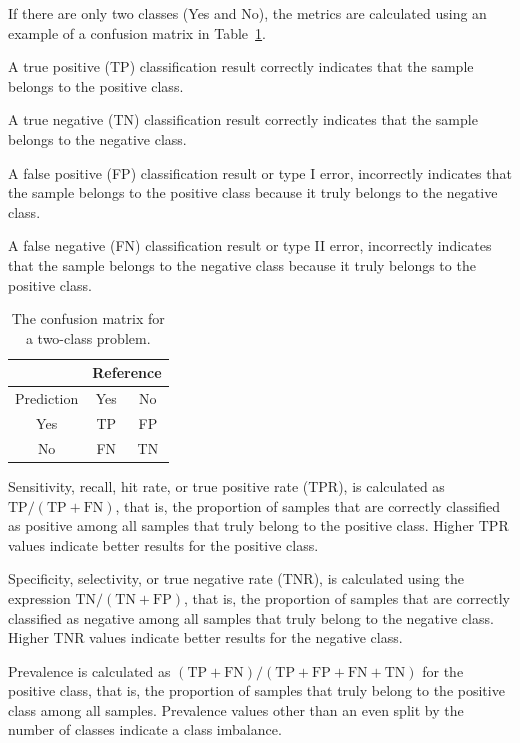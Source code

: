 \documentclass[sn-mathphys-num]{sn-jnl}%
\begin{document}
If there are only two classes (Yes and No), the metrics are calculated using an example of a confusion matrix in Table~\ref{tab:cm}.

A true positive (TP) classification result correctly indicates that the sample belongs to the positive class.

A true negative (TN) classification result correctly indicates that the sample belongs to the negative class.
 
A false positive (FP) classification result or type I error, incorrectly indicates that the sample belongs to the positive class because it truly belongs to the negative class.

A false negative (FN) classification result or type II error, incorrectly indicates that the sample belongs to the negative class because it truly belongs to the positive class.

\begin{table}[!ht]
    \centering
    \caption{The confusion matrix for a two-class problem.}
	\label{tab:cm}
	\begin{tabular}{|c|c|c|}
		\hline
		 & \multicolumn{2}{|c|}{Reference} \\ \hline
        Prediction & Yes & No \\ \hline
        Yes & TP & FP \\ \hline
        No & FN & TN \\ \hline
	\end{tabular}
\end{table}

Sensitivity, recall, hit rate, or true positive rate (TPR), is calculated as $\mathrm{TP}/(\mathrm{TP}+\mathrm{FN})$, that is, the proportion of samples that are correctly classified as positive among all samples that truly belong to the positive class. Higher TPR values indicate better results for the positive class.

Specificity, selectivity, or true negative rate (TNR), is calculated using the expression $\mathrm{TN}/(\mathrm{TN}+\mathrm{FP})$, that is, the proportion of samples that are correctly classified as negative among all samples that truly belong to the negative class. Higher TNR values indicate better results for the negative class.

Prevalence is calculated as $(\mathrm{TP}+\mathrm{FN})/(\mathrm{TP}+\mathrm{FP}+\mathrm{FN}+\mathrm{TN})$ for the positive class, that is, the proportion of samples that truly belong to the positive class among all samples. Prevalence values other than an even split by the number of classes indicate a class imbalance.
\end{document}
